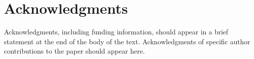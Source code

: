 \documentclass[11pt]{article}
\begin{document}
\section{Acknowledgments} 

Acknowledgments, including funding
information, should appear in a brief statement at the end of the body
of the text. Acknowledgments of specific author contributions to the
paper should appear here.









\end{document}
